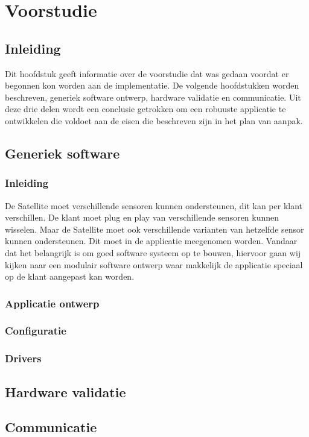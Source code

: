 \chapter{Voorstudie}
\section{Inleiding}
Dit hoofdstuk geeft informatie over de voorstudie dat was gedaan voordat er begonnen kon worden aan de implementatie. De volgende hoofdstukken worden beschreven, generiek software ontwerp, hardware validatie en communicatie. Uit deze drie delen wordt een conclusie getrokken om een robuuste applicatie te ontwikkelen die voldoet aan de eisen die beschreven zijn in het plan van aanpak.

\section{Generiek software}
\subsection{Inleiding}
De Satellite moet verschillende sensoren kunnen ondersteunen, dit kan per klant verschillen. De klant moet plug en play van verschillende sensoren kunnen wisselen. Maar de Satellite moet ook verschillende varianten van hetzelfde sensor kunnen ondersteunen. Dit moet in de applicatie meegenomen worden. Vandaar dat het belangrijk is om goed software systeem op te bouwen, hiervoor gaan wij kijken naar een modulair software ontwerp waar makkelijk de applicatie speciaal op de klant aangepast kan worden.

\subsection{Applicatie ontwerp}

\subsection{Configuratie}
\autocite{ConfiguratieVoorstudie}
\subsection{Drivers}


\newpage
\section{Hardware validatie}


\newpage
\section{Communicatie}
